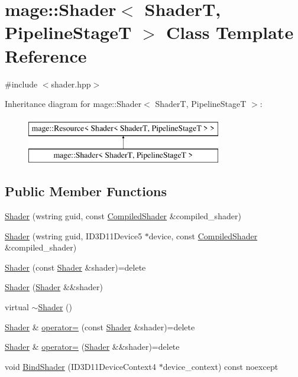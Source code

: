 \hypertarget{classmage_1_1_shader}{}\section{mage\+:\+:Shader$<$ ShaderT, Pipeline\+StageT $>$ Class Template Reference}
\label{classmage_1_1_shader}


{\ttfamily \#include $<$shader.\+hpp$>$}

Inheritance diagram for mage\+:\+:Shader$<$ ShaderT, Pipeline\+StageT $>$\+:\begin{figure}[H]
\begin{center}
\leavevmode
\includegraphics[height=2.000000cm]{classmage_1_1_shader}
\end{center}
\end{figure}
\subsection*{Public Member Functions}
\begin{DoxyCompactItemize}
\item 
\hyperlink{classmage_1_1_shader_a70caa62e6ea79bd63e2d825850c4d6dc}{Shader} (wstring guid, const \hyperlink{structmage_1_1_compiled_shader}{Compiled\+Shader} \&compiled\+\_\+shader)
\item 
\hyperlink{classmage_1_1_shader_a7f8d27e6e1e74e8aca55e854178dd0e5}{Shader} (wstring guid, I\+D3\+D11\+Device5 $\ast$device, const \hyperlink{structmage_1_1_compiled_shader}{Compiled\+Shader} \&compiled\+\_\+shader)
\item 
\hyperlink{classmage_1_1_shader_a22a14b034479acb369c32775bb6a7c09}{Shader} (const \hyperlink{classmage_1_1_shader}{Shader} \&shader)=delete
\item 
\hyperlink{classmage_1_1_shader_ae592c09b088634c799fc1db7eb15ec54}{Shader} (\hyperlink{classmage_1_1_shader}{Shader} \&\&shader)
\item 
virtual \hyperlink{classmage_1_1_shader_a10a954f75331d93c9549b2db5a2c838e}{$\sim$\+Shader} ()
\item 
\hyperlink{classmage_1_1_shader}{Shader} \& \hyperlink{classmage_1_1_shader_abcb23e3972015f2cc9127e1e4cd4569b}{operator=} (const \hyperlink{classmage_1_1_shader}{Shader} \&shader)=delete
\item 
\hyperlink{classmage_1_1_shader}{Shader} \& \hyperlink{classmage_1_1_shader_a9f1d94db7a9d62bace24e065e68192bf}{operator=} (\hyperlink{classmage_1_1_shader}{Shader} \&\&shader)=delete
\item 
void \hyperlink{classmage_1_1_shader_ae21e9f9a4e97d8d73f3988815c1cb205}{Bind\+Shader} (I\+D3\+D11\+Device\+Context4 $\ast$device\+\_\+context) const noexcept
\end{DoxyCompactItemize}

